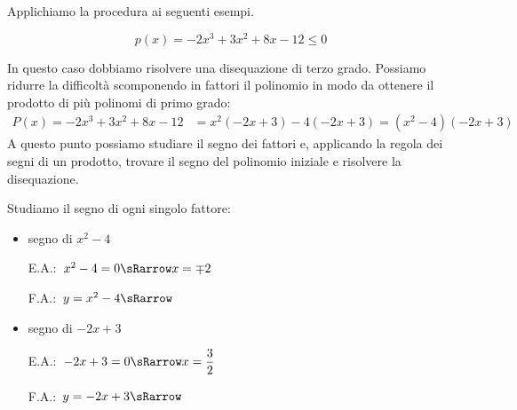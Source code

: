 Applichiamo la procedura ai seguenti esempi.

\newpage %

\begin{esempio}
 \[p(x)=-2x^3+3x^2+8x-12 \le 0\]

In questo caso dobbiamo risolvere una disequazione di terzo grado. 
Possiamo ridurre la difficoltà scomponendo in fattori il polinomio in modo da 
ottenere il prodotto di più polinomi di primo grado:
\begin{align*}
P(x) = -2x^3+3x^2+8x-12 &= x^2(-2x+3)-4(-2x+3) = (x^2-4)(-2x+3)
\end{align*}
A questo punto possiamo studiare il segno dei fattori e, applicando la regola 
dei segni di un prodotto, trovare il segno del polinomio iniziale e risolvere 
la disequazione.

Studiamo il segno di ogni singolo fattore:
\begin{itemize}

 \item segno di \(x^2-4\)\\
 \begin{minipage}{.35\textwidth}
  E.A.:~\(x^2-4=0 \sRarrow x=\mp 2\)
 \end{minipage}
 \begin{minipage}{.25\textwidth}
  F.A.:~\(y=x^2-4 \sRarrow\)
 \end{minipage}
 \begin{minipage}{.38\textwidth}
  \begin{inaccessibleblock}
\end{inaccessibleblock}
 \end{minipage}
 
 \item  segno di \(-2x+3\)\\
 \begin{minipage}{.35\textwidth}
  E.A.:~\(-2x+3=0 \sRarrow x=\dfrac{3}{2}\)
  \vspace{1.8em}
 \end{minipage}
 \begin{minipage}{.25\textwidth}
  F.A.:~\(y=-2x+3 \sRarrow \)
  \vspace{1.8em}
 \end{minipage}
 \begin{minipage}{.38\textwidth}
  \begin{inaccessibleblock}
\end{inaccessibleblock}
 \end{minipage}
 

\end{itemize}
\end{esempio}
